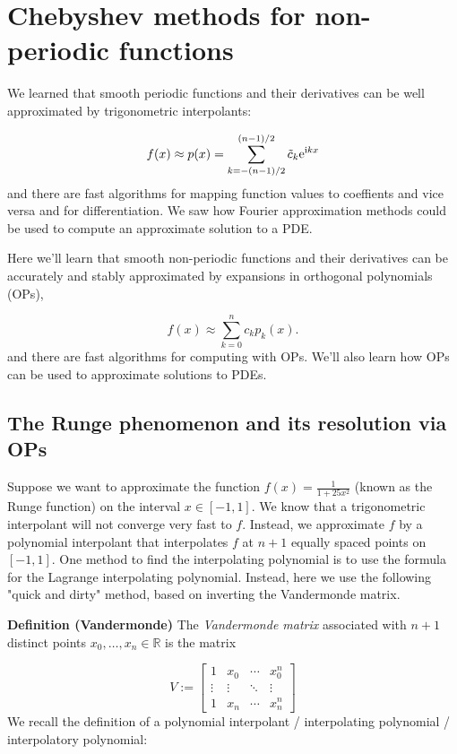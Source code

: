 \documentclass[12pt,a4paper]{article}
\def\bbR{ {\mathbb R} }
\begin{document}
\section{Chebyshev methods for non-periodic functions}
We learned that smooth periodic functions and their derivatives can be well approximated by trigonometric interpolants:

\[
f(x) \approx p(x) =  \sum_{k=-(n-1)/2}^{(n-1)/2} \tilde{c}_k{\rm e}^{{\rm i}kx}
\]
and there are fast algorithms for mapping function values to coeffients and vice versa and for differentiation.  We saw how Fourier approximation methods could be used to compute an approximate solution to a PDE.

Here we'll learn that smooth non-periodic functions and their derivatives can be accurately and stably approximated by expansions in orthogonal polynomials (OPs),

\[
f(x) \approx \sum_{k = 0}^{n}  c_k p_k(x).
\]
and there are  fast algorithms for computing with OPs.  We'll also learn how OPs can be used to approximate solutions to PDEs.

\subsection{The Runge phenomenon and its resolution via OPs}
Suppose we want to approximate the function $f(x) = \frac{1}{1 + 25x^2}$ (known as the Runge function) on the interval $x \in[-1, 1]$.  We know that a trigonometric interpolant will not converge very fast to $f$.  Instead, we approximate $f$ by a polynomial interpolant that interpolates $f$ at $n+1$ equally spaced points on $[-1, 1]$.  One method to find the interpolating polynomial is to use the formula for the Lagrange interpolating polynomial.  Instead, here we use the following "quick and dirty" method, based on inverting the Vandermonde matrix. 

\textbf{Definition (Vandermonde)} The \emph{Vandermonde matrix} associated with $n+1$ distinct points $x_0,\ensuremath{\ldots},x_n \ensuremath{\in} \ensuremath{\bbR}$ is the matrix

\[
V := \begin{bmatrix} 1 & x_0 & \ensuremath{\cdots} & x_0^{n} \\
                    \ensuremath{\vdots} & \ensuremath{\vdots} & \ensuremath{\ddots} & \ensuremath{\vdots} \\
                    1 & x_n & \ensuremath{\cdots} & x_n^{n}
                    \end{bmatrix}
\]
We recall the definition of a polynomial interpolant / interpolating polynomial / interpolatory polynomial:
\end{document}
